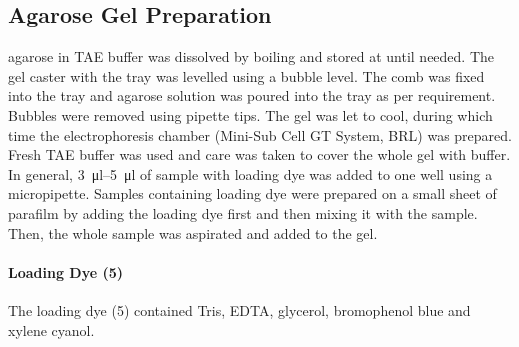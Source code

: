 \subsection{Agarose Gel Preparation\label{gel-prep}}
 agarose in TAE buffer was dissolved by boiling and stored at  until needed. The gel caster with the tray was levelled using a bubble level. The comb was fixed into the tray and agarose solution was poured into the tray as per requirement. Bubbles were removed using  pipette tips. The gel was let to cool, during which time the electrophoresis chamber (Mini-Sub Cell GT System, BRL) was prepared. Fresh TAE buffer was used and care was taken to cover the whole gel with buffer. In general, \SIrange{3}{5}{\micro\litre} of sample with loading dye was added to one well using a micropipette. Samples containing loading dye were prepared on a small sheet of parafilm by adding the loading dye first and then mixing it with the sample. Then, the whole sample was aspirated and added to the gel.

\paragraph{Loading Dye (\SI{5}{\concfac})}
The loading dye (\SI{5}{\concfac}) contained  Tris,  EDTA,  glycerol,  bromophenol blue and  xylene cyanol.

